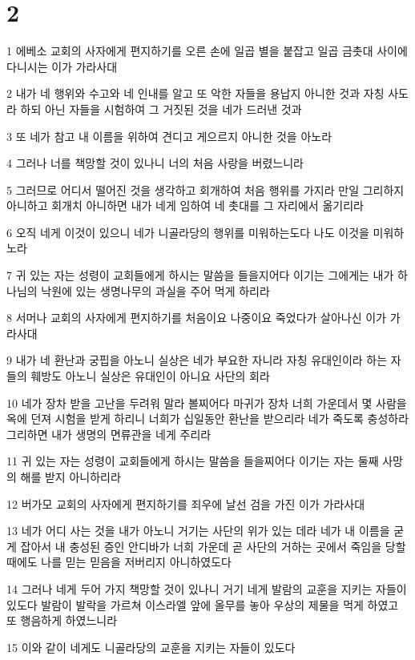 \chapter{2}

\par 1 에베소 교회의 사자에게 편지하기를 오른 손에 일곱 별을 붙잡고 일곱 금촛대 사이에 다니시는 이가 가라사대
\par 2 내가 네 행위와 수고와 네 인내를 알고 또 악한 자들을 용납지 아니한 것과 자칭 사도라 하되 아닌 자들을 시험하여 그 거짓된 것을 네가 드러낸 것과
\par 3 또 네가 참고 내 이름을 위하여 견디고 게으르지 아니한 것을 아노라
\par 4 그러나 너를 책망할 것이 있나니 너의 처음 사랑을 버렸느니라
\par 5 그러므로 어디서 떨어진 것을 생각하고 회개하여 처음 행위를 가지라 만일 그리하지 아니하고 회개치 아니하면 내가 네게 임하여 네 촛대를 그 자리에서 옮기리라
\par 6 오직 네게 이것이 있으니 네가 니골라당의 행위를 미워하는도다 나도 이것을 미워하노라
\par 7 귀 있는 자는 성령이 교회들에게 하시는 말씀을 들을지어다 이기는 그에게는 내가 하나님의 낙원에 있는 생명나무의 과실을 주어 먹게 하리라
\par 8 서머나 교회의 사자에게 편지하기를 처음이요 나중이요 죽었다가 살아나신 이가 가라사대
\par 9 내가 네 환난과 궁핍을 아노니 실상은 네가 부요한 자니라 자칭 유대인이라 하는 자들의 훼방도 아노니 실상은 유대인이 아니요 사단의 회라
\par 10 네가 장차 받을 고난을 두려워 말라 볼찌어다 마귀가 장차 너희 가운데서 몇 사람을 옥에 던져 시험을 받게 하리니 너희가 십일동안 환난을 받으리라 네가 죽도록 충성하라 그리하면 내가 생명의 면류관을 네게 주리라
\par 11 귀 있는 자는 성령이 교회들에게 하시는 말씀을 들을찌어다 이기는 자는 둘째 사망의 해를 받지 아니하리라
\par 12 버가모 교회의 사자에게 편지하기를 죄우에 날선 검을 가진 이가 가라사대
\par 13 네가 어디 사는 것을 내가 아노니 거기는 사단의 위가 있는 데라 네가 내 이름을 굳게 잡아서 내 충성된 증인 안디바가 너희 가운데 곧 사단의 거하는 곳에서 죽임을 당할 때에도 나를 믿는 믿음을 저버리지 아니하였도다
\par 14 그러나 네게 두어 가지 책망할 것이 있나니 거기 네게 발람의 교훈을 지키는 자들이 있도다 발람이 발락을 가르쳐 이스라엘 앞에 올무를 놓아 우상의 제물을 먹게 하였고 또 행음하게 하였느니라
\par 15 이와 같이 네게도 니골라당의 교훈을 지키는 자들이 있도다
